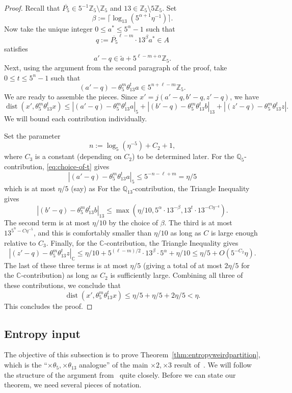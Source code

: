 \documentclass[11pt]{amsart}
\theoremstyle{definition}
\newcommand{\C}{{\mathbb C}}
\newcommand{\Q}{{\mathbb Q}}
\newcommand{\Z}{{\mathbb Z}}
\DeclareMathOperator{\dist}{dist}
\begin{document}
\begin{proof}
Recall that $\overline{P_5} \in 5^{-1}\Z_5 \setminus \Z_5$ and $13 \in \Z_5 \setminus 5\Z_5$.  Set
$$\beta:=\lceil \log_{13}(5^{\alpha+1}\eta^{-1}) \rceil.$$
Now take the unique integer $0 \leq a^* \leq 5^\alpha-1$ such that
$$q:=\overline{P_5}^{\ell-m} \cdot 13^\beta a^* \in A$$
satisfies
$$a'-q \in \widetilde{a}+5^{\ell-m+\alpha}\Z_5.$$
Next, using the argument from the second paragraph of the proof, take $0 \leq t \leq 5^n-1$ such that
\begin{equation}\label{eq:choice-of-t}
(a'-q)-\theta_5^m \theta_{13}^t a \in 5^{n+\ell-m} \mathbb{Z}_5.
\end{equation}
We are ready to assemble the pieces.  Since $x'=j(a'-q,b'-q,z'-q)$, we have
$$\dist(x',\theta_5^m \theta_{13}^t x) \leq |(a'-q)-\theta_5^m \theta_{13}^t a|_5+|(b'-q)-\theta_5^m \theta_{13}^t b|_{13}+|(z'-q)-\theta_5^m \theta_{13}^t z|.$$
We will bound each contribution individually.

Set the parameter
$$n:=\log_5 (\eta^{-5})+C_2+1,$$
where $C_3$ is a constant (depending on $C_2$) to be determined later.  For the $\Q_5$-contribution, \eqref{eq:choice-of-t} gives
$$|(a'-q)-\theta_5^m \theta_{13}^t a|_5 \leq 5^{-n-\ell+m}=\eta/5$$
which is at most $\eta/5$ (say) as For the $\Q_{13}$-contribution, the Triangle Inequality gives
$$|(b'-q)-\theta_5^m \theta_{13}^t b|_{13} \leq \max(\eta/10, 5^\alpha \cdot 13^{-\beta}, 13^t \cdot 13^{-C \eta^{-4}}) %
.$$
The second term is at most $\eta/10$ by the choice of $\beta$.  The third is at most $13^{5^n-C\eta^{-5}}$, and this is comfortably smaller than $\eta/10$ as long as $C$ is large enough relative to $C_3$.
Finally, for the $\C$-contribution, the Triangle Inequality gives
$$|(z'-q)-\theta_5^m \theta_{13}^t z|_{\C} \leq \eta/10+5^{(\ell-m)/2} \cdot 13^\beta \cdot 5^\alpha+\eta/10 \leq \eta/5+O(5^{-C_2}\eta).$$
The last of these three terms is at most $\eta/5$ (giving a total of at most $2\eta/5$ for the $\C$-contribution) as long as $C_2$ is sufficiently large.  Combining all three of these contributions, we conclude that
$$\dist(x',\theta_5^m \theta_{13}^t x) \leq \eta/5+\eta/5+2\eta/5<\eta.$$
This concludes the proof.
\end{proof}










\subsection{Entropy input}\label{subs:entropy}
The objective of this subsection is to prove Theorem~\ref{thm:entropyweirdpartition}, which is the ``$\times \theta_5, \times \theta_{13}$ analogue'' of the main $\times 2, \times 3$ result of~\cite[Theorem 3.2]{BLMV08}.  We will follow the structure of the argument from~\cite{BLMV08} quite closely.  Before we can state our theorem, we need several pieces of notation.
\end{document}
